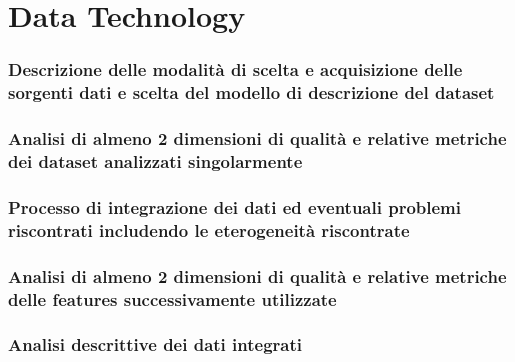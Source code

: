\part{Data Technology}
\section{Descrizione delle modalità di scelta e acquisizione delle sorgenti dati e scelta del modello di descrizione del dataset}
\section{Analisi di almeno 2 dimensioni di qualità e relative metriche dei dataset analizzati singolarmente}
\section{Processo di integrazione dei dati ed eventuali problemi riscontrati includendo le eterogeneità riscontrate}
\section{Analisi di almeno 2 dimensioni di qualità e relative metriche delle features successivamente utilizzate}
\section{Analisi descrittive dei dati integrati}
